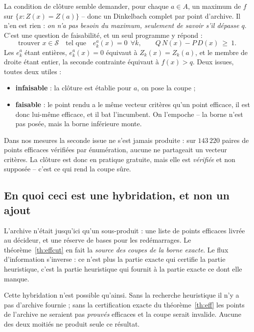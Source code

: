 \documentclass[11pt,a4paper]{article}
\theoremstyle{plain}
\theoremstyle{remark}
\newcommand{\Scal}{\mathcal{S}}
\begin{document}
La condition de clôture semble demander, pour chaque $a\in A$, un maximum de
$f$ sur $\{x:Z(x)=Z(a)\}$ -- donc un Dinkelbach complet par point
d'archive. Il n'en est rien : \emph{on n'a pas besoin du maximum, seulement
de savoir s'il dépasse $q$}. C'est une question de faisabilité, et un seul
programme y répond :
\[
  \text{trouver } x\in\Scal \quad\text{tel que}\quad
  e^a_k(x)=0\ \ \forall k,
  \qquad Q\,N(x)-P\,D(x)\ \ge\ 1 .
\]
Les $e^a_k$ étant entières, $e^a_k(x)=0$ équivaut à $Z_k(x)=Z_k(a)$, et le
membre de droite étant entier, la seconde contrainte équivaut à $f(x)>q$.
Deux issues, toutes deux utiles :

\begin{itemize}[leftmargin=*,itemsep=2pt]
\item \textbf{infaisable} : la clôture est établie pour $a$, on pose la
      coupe ;
\item \textbf{faisable} : le point rendu a le même vecteur critères qu'un
      point efficace, il est donc lui-même efficace, et il bat l'incumbent.
      On l'empoche -- la borne n'est pas posée, mais la borne inférieure
      monte.
\end{itemize}

\noindent
Dans nos mesures la seconde issue ne s'est jamais produite : sur
$143\,220$ paires de points efficaces vérifiées par énumération, aucune ne
partageait un vecteur critères. La clôture est donc en pratique gratuite,
mais elle est \emph{vérifiée} et non supposée -- c'est ce qui rend la coupe
sûre.

\subsection{En quoi ceci est une hybridation, et non un ajout}

L'archive n'était jusqu'ici qu'un sous-produit : une liste de points
efficaces livrée au décideur, et une réserve de bases pour les redémarrages.
Le théorème~\ref{th:effcut} en fait la \emph{source des coupes de la borne
exacte}. Le flux d'information s'inverse : ce n'est plus la partie exacte qui
certifie la partie heuristique, c'est la partie heuristique qui fournit à la
partie exacte ce dont elle manque.

Cette hybridation n'est possible qu'ainsi. Sans la recherche heuristique il
n'y a pas d'archive fournie ; sans la certification exacte du
théorème~\ref{th:eff} les points de l'archive ne seraient pas \emph{prouvés}
efficaces et la coupe serait invalide. Aucune des deux moitiés ne produit
seule ce résultat.
\end{document}
